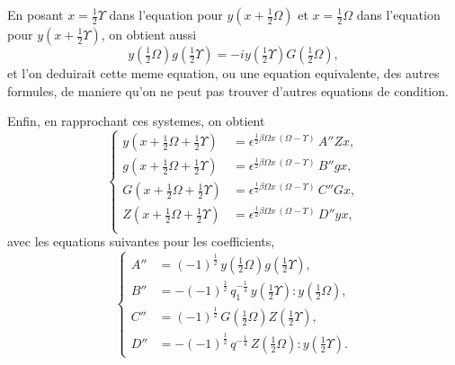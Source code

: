 \documentclass[11pt,a4paper]{book}
\begin{document}
En posant $x = \frac{1}{2}\Upsilon$ dans l'equation pour $y\left(x + \frac{1}{2}\Omega\right)$ et $x = \frac{1}{2}\Omega$ dans l'equation pour
$y\left(x + \frac{1}{2}\Upsilon\right)$, on obtient aussi
\begin{equation}
y\left(\tfrac{1}{2}\Omega\right) g\left(\tfrac{1}{2}\Upsilon\right) = -iy\left(\tfrac{1}{2}\Upsilon\right) G\left(\tfrac{1}{2}\Omega\right), \tag{28}
\end{equation}
et l'on deduirait cette meme equation, ou une equation equivalente, des autres
formules, de maniere qu'on ne peut pas trouver d'autres equations de condition.

Enfin, en rapprochant ces systemes, on obtient
\begin{equation}
\left\{
\begin{aligned}
y\left(x + \tfrac{1}{2}\Omega + \tfrac{1}{2}\Upsilon\right) &= \epsilon^{\frac{1}{2}\beta\Omega x\, (\Omega - \Upsilon)}\, A''Zx,\\
g\left(x + \tfrac{1}{2}\Omega + \tfrac{1}{2}\Upsilon\right) &= \epsilon^{\frac{1}{2}\beta\Omega x\, (\Omega - \Upsilon)}\, B''gx,\\
G\left(x + \tfrac{1}{2}\Omega + \tfrac{1}{2}\Upsilon\right) &= \epsilon^{\frac{1}{2}\beta\Omega x\, (\Omega - \Upsilon)}\, C''Gx,\\
Z\left(x + \tfrac{1}{2}\Omega + \tfrac{1}{2}\Upsilon\right) &= \epsilon^{\frac{1}{2}\beta\Omega x\, (\Omega - \Upsilon)}\, D''yx,\\
\end{aligned}
\right. \tag{29}
\end{equation}
avec les equations suivantes pour les coefficients,
\begin{equation}
\left\{
\begin{aligned}
A'' &= (-1)^{\frac{1}{2}}\, y\left(\tfrac{1}{2}\Omega\right) g\left(\tfrac{1}{2}\Upsilon\right),\\
B'' &= -(-1)^{\frac{1}{2}}\, q_1^{-\frac{1}{4}}\, y\left(\tfrac{1}{2}\Upsilon\right) : y\left(\tfrac{1}{2}\Omega\right),\\
C'' &= (-1)^{\frac{1}{2}}\, G\left(\tfrac{1}{2}\Omega\right) Z\left(\tfrac{1}{2}\Upsilon\right),\\
D'' &= -(-1)^{\frac{1}{2}}\, q^{-\frac{1}{4}}\, Z\left(\tfrac{1}{2}\Omega\right) : y\left(\tfrac{1}{2}\Upsilon\right).
\end{aligned}
\right. \tag{30}
\end{equation}
\end{document}
